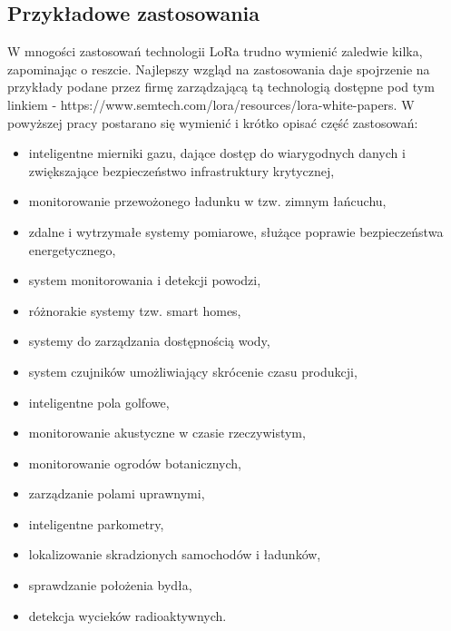 \subsection{Przykładowe zastosowania}
W mnogości zastosowań technologii LoRa trudno wymienić zaledwie kilka, zapominając o reszcie. Najlepszy wzgląd na zastosowania daje spojrzenie na przykłady podane przez firmę zarządzającą tą technologią dostępne pod tym linkiem - https://www.semtech.com/lora/resources/lora-white-papers.
W powyższej pracy postarano się wymienić i krótko opisać część zastosowań:
\begin{itemize}
	\item inteligentne mierniki gazu, dające dostęp do wiarygodnych danych i zwiększające bezpieczeństwo infrastruktury krytycznej,
	\item monitorowanie przewożonego ładunku w tzw. zimnym łańcuchu,
	\item zdalne i wytrzymałe systemy pomiarowe, służące poprawie bezpieczeństwa energetycznego,
	\item system monitorowania i detekcji powodzi,
	\item różnorakie systemy tzw. smart homes,
	\item systemy do zarządzania dostępnością wody,
	\item system czujników umożliwiający skrócenie czasu produkcji,
	\item inteligentne pola golfowe,
	\item monitorowanie akustyczne w czasie rzeczywistym,
	\item monitorowanie ogrodów botanicznych,
	\item zarządzanie polami uprawnymi,
	\item inteligentne parkometry,
	\item lokalizowanie skradzionych samochodów i ładunków,
	\item sprawdzanie położenia bydła,
	\item detekcja wycieków radioaktywnych.
\end{itemize}
